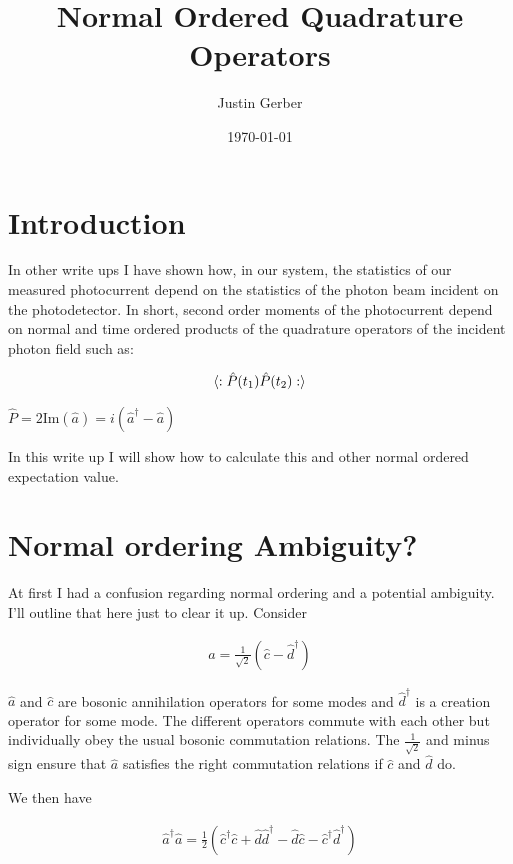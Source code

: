 \documentclass[12pt]{article}
\newcommand{\ahat}{\hat{a}}
\newcommand{\adag}{\ahat^{\dag}}
\begin{document}
\title{Normal Ordered Quadrature Operators}
\author{Justin Gerber}
\date{\today}
\maketitle

\section{Introduction}

In other write ups I have shown how, in our system, the statistics of our measured photocurrent depend on the statistics of the photon beam incident on the photodetector. In short, second order moments of the photocurrent depend on normal and time ordered products of the quadrature operators of the incident photon field such as:

\begin{align}
\braket{:\hat{P}(t_1)\hat{P}(t_2):}
\end{align}

$\hat{P} = 2\text{Im}(\ahat) = i(\adag-\ahat)$

In this write up I will show how to calculate this and other normal ordered expectation value.

\section{Normal ordering Ambiguity?}
At first I had a confusion regarding normal ordering and a potential ambiguity. I'll outline that here just to clear it up.
Consider

\begin{align}
\ahat = \frac{1}{\sqrt{2}}(\hat{c}-\hat{d}^{\dag})
\end{align}

$\ahat$ and $\hat{c}$ are bosonic annihilation operators for some modes and $\hat{d}^{\dag}$ is a creation operator for some mode. The different operators commute with each other but individually obey the usual bosonic commutation relations. The $\frac{1}{\sqrt{2}}$ and minus sign ensure that $\ahat$ satisfies the right commutation relations if $\hat{c}$ and $\hat{d}$ do.

We then have 

\begin{align}
\adag\ahat = \frac{1}{2}(\hat{c}^{\dag}\hat{c} + \hat{d}\hat{d}^{\dag} - \hat{d}\hat{c} -\hat{c}^{\dag}\hat{d}^{\dag})
\end{align}
\end{document}
